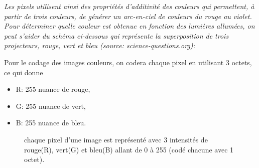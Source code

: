 \textit{Les pixels utilisent ainsi des propriétés d'additivité des couleurs qui permettent, à partir de trois couleurs, de générer un arc-en-ciel de couleurs du rouge au violet. Pour déterminer quelle couleur est obtenue en fonction des lumières allumées, on peut s'aider du schéma ci-dessous qui représente la superposition de trois projecteurs, rouge, vert et bleu (source: science-questions.org):}

Pour le codage des images couleurs, on codera chaque pixel en utilisant 3 octets, ce qui donne
\begin{itemize}
	\item R: 255 nuance de rouge,
	\item G: 255 nuance de vert,
	\item B: 255 nuance de bleu.
\end{itemize}

\begin{figure}[h!]
	\centering
	\hspace{1cm}
	\caption{chaque pixel d'une image est représenté avec 3 intensités de rouge(R), vert(G) et bleu(B) allant de 0 à 255 (codé chacune avec 1 octet).}
	\label{img_coul}
\end{figure}


